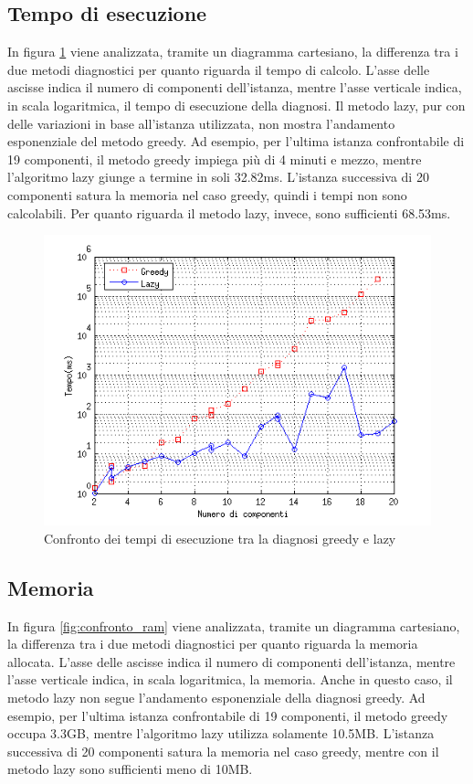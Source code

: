 \subsection{Tempo di esecuzione}
In figura \ref{fig:confronto_tempo} viene analizzata, tramite un diagramma cartesiano, la differenza tra i due metodi diagnostici per quanto  riguarda il tempo di calcolo. L'asse delle ascisse indica il numero di componenti dell'istanza, mentre l'asse verticale indica, in scala logaritmica, il tempo di esecuzione della diagnosi. Il metodo lazy, pur con delle variazioni in base all'istanza utilizzata, non mostra l'andamento esponenziale del metodo greedy. Ad esempio, per l'ultima istanza confrontabile di 19 componenti, il metodo greedy impiega più di 4 minuti e mezzo, mentre l'algoritmo lazy giunge a termine in soli 32.82ms. 
L'istanza successiva di 20 componenti satura la memoria nel caso greedy, quindi i tempi non sono calcolabili. Per quanto riguarda il metodo lazy, invece, sono sufficienti 68.53ms.


\begin{figure}[htbp]
\centering
\includegraphics[scale=0.7]{./Img/sperimentazione/confronto_tempo.png}
\caption{Confronto dei tempi di esecuzione tra la diagnosi greedy e lazy}
\label{fig:confronto_tempo}
\end{figure}

\subsection{Memoria}
In figura \ref{fig:confronto_ram} viene analizzata, tramite un diagramma cartesiano, la differenza tra i due metodi diagnostici per quanto riguarda la memoria allocata. L'asse delle ascisse indica il numero di componenti dell'istanza, mentre l'asse verticale indica, in scala logaritmica, la memoria. Anche in questo caso, il metodo lazy non segue l'andamento esponenziale della diagnosi greedy. Ad esempio, per l'ultima istanza confrontabile di 19 componenti, il metodo greedy occupa 3.3GB, mentre l'algoritmo lazy utilizza solamente 10.5MB. L'istanza successiva di 20 componenti satura la memoria nel caso greedy, mentre con il metodo lazy sono sufficienti meno di 10MB.

